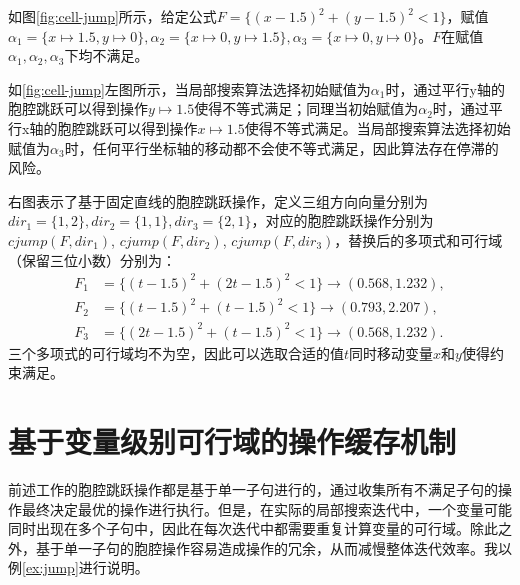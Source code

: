 \begin{example}
如图\ref{fig:cell-jump}所示，给定公式$F = \{(x - 1.5)^2 + (y - 1.5)^2 < 1\}$，赋值$\alpha_1 = \{x \mapsto 1.5, y \mapsto 0\}, \alpha_2 = \{x \mapsto 0, y \mapsto 1.5\}, \alpha_3 = \{x \mapsto 0, y \mapsto 0\}$。$F$在赋值$\alpha_1, \alpha_2, \alpha_3$下均不满足。

如\ref{fig:cell-jump}左图所示，当局部搜索算法选择初始赋值为$\alpha_1$时，通过平行y轴的胞腔跳跃可以得到操作$y \mapsto 1.5$使得不等式满足；同理当初始赋值为$\alpha_2$时，通过平行x轴的胞腔跳跃可以得到操作$x \mapsto 1.5$使得不等式满足。当局部搜索算法选择初始赋值为$\alpha_3$时，任何平行坐标轴的移动都不会使不等式满足，因此算法存在停滞的风险。

右图表示了基于固定直线的胞腔跳跃操作，定义三组方向向量分别为$dir_1 = \{1, 2\}, dir_2 = \{1, 1\}, dir_3 = \{2, 1\}$，对应的胞腔跳跃操作分别为$cjump(F, dir_1)$, $cjump(F, dir_2)$, $cjump(F, dir_3)$，替换后的多项式和可行域（保留三位小数）分别为：
\begin{align*}
    F_1 &= \{(t - 1.5)^2 + (2t - 1.5)^2 < 1\} \rightarrow (0.568, 1.232), \\
    F_2 &= \{(t - 1.5)^2 + (t - 1.5)^2 < 1\} \rightarrow (0.793, 2.207), \\
    F_3 &= \{(2t - 1.5)^2 + (t - 1.5)^2 < 1\} \rightarrow (0.568, 1.232).
\end{align*}
三个多项式的可行域均不为空，因此可以选取合适的值$t$同时移动变量$x$和$y$使得约束满足。
\end{example}

\section{基于变量级别可行域的操作缓存机制}
前述工作的胞腔跳跃操作都是基于单一子句进行的，通过收集所有不满足子句的操作最终决定最优的操作进行执行。但是，在实际的局部搜索迭代中，一个变量可能同时出现在多个子句中，因此在每次迭代中都需要重复计算变量的可行域。除此之外，基于单一子句的胞腔操作容易造成操作的冗余，从而减慢整体迭代效率。我以例\ref{ex:jump}进行说明。

